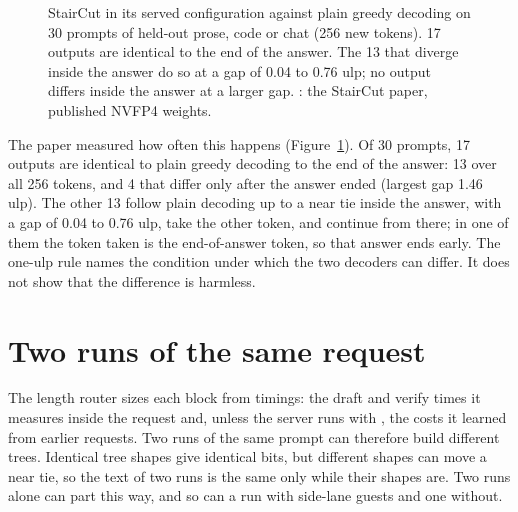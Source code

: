 \begin{figure}[htbp]
\centering
{}
\caption[Agreement with plain greedy decoding]{StairCut in its served configuration against plain greedy decoding on 30 prompts of held-out prose, code or chat (256 new tokens). 17 outputs are identical to the end of the answer. The 13 that diverge inside the answer do so at a gap of 0.04 to 0.76 ulp; no output differs inside the answer at a larger gap. \measured: the StairCut paper, published NVFP4 weights.}\label{fig:agreement}
\end{figure}

The paper measured how often this happens (Figure~\ref{fig:agreement}). Of 30 prompts, 17 outputs are identical to plain greedy decoding to the end of the answer: 13 over all 256 tokens, and 4 that differ only after the answer ended (largest gap 1.46 ulp). The other 13 follow plain decoding up to a near tie inside the answer, with a gap of 0.04 to 0.76 ulp, take the other token, and continue from there; in one of them the token taken is the end-of-answer token, so that answer ends early. The one-ulp rule names the condition under which the two decoders can differ. It does not show that the difference is harmless.

\section{Two runs of the same request}\label{sec:two-runs}

The length router sizes each block from timings: the draft and verify times it measures inside the request and, unless the server runs with , the costs it learned from earlier requests. Two runs of the same prompt can therefore build different trees. Identical tree shapes give identical bits, but different shapes can move a near tie, so the text of two runs is the same only while their shapes are. Two runs alone can part this way, and so can a run with side-lane guests and one without.

